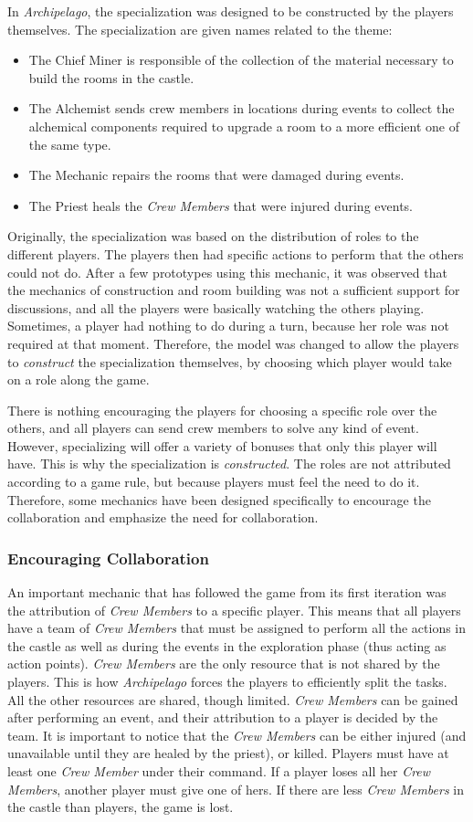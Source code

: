 In \textit{Archipelago}, the specialization was designed to be constructed by the players themselves. The specialization are given names related to the theme:
\begin{itemize}
\item The Chief Miner is responsible of the collection of the material necessary to build the rooms in the castle. 
\item The Alchemist sends crew members in locations during events to collect the alchemical components required to upgrade a room to a more efficient one of the same type.
\item The Mechanic repairs the rooms that were damaged during events.
\item The Priest heals the \textit{Crew Members} that were injured during events.
\end{itemize}
Originally, the specialization was based on the distribution of roles to the different players. The players then had specific actions to perform that the others could not do. After a few prototypes using this mechanic, it was observed that the mechanics of construction and room building was not a sufficient support for discussions, and all the players were basically watching the others playing. Sometimes, a player had nothing to do during a turn, because her role was not required at that moment. Therefore, the model was changed to allow the players to \textit{construct} the specialization themselves, by choosing which player would take on a role along the game.

There is nothing encouraging the players for choosing a specific role over the others, and all players can send crew members to solve any kind of event. However, specializing will offer a variety of bonuses that only this player will have. This is why the specialization is \textit{constructed}. The roles are not attributed according to a game rule, but because players must feel the need to do it. Therefore, some mechanics have been designed specifically to encourage the collaboration and emphasize the need for collaboration.
\subsubsection{Encouraging Collaboration} 
An important mechanic that has followed the game from its first iteration was the attribution of \textit{Crew Members} to a specific player. This means that all players have a team of \textit{Crew Members} that must be assigned to perform all the actions in the castle as well as during the events in the exploration phase (thus acting as action points). \textit{Crew Members} are the only resource that is not shared by the players. This is how \textit{Archipelago} forces the players to efficiently split the tasks. All the other resources are shared, though limited. \textit{Crew Members} can be gained after performing an event, and their attribution to a player is decided by the team. It is important to notice that the \textit{Crew Members} can be either injured (and unavailable until they are healed by the priest), or killed. Players must have at least one \textit{Crew Member} under their command. If a player loses all her \textit{Crew Members}, another player must give one of hers. If there are less \textit{Crew Members} in the castle than players, the game is lost.
